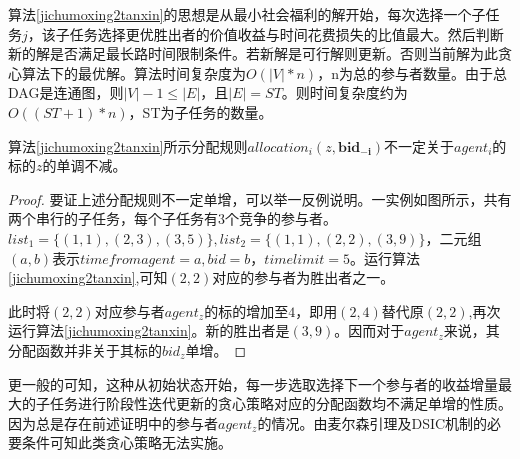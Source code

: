 \documentclass[promaster]{thesis-uestc}
\begin{document}
算法\ref{jichumoxing2tanxin}的思想是从最小社会福利的解开始，每次选择一个子任务$j$，该子任务选择更优胜出者的价值收益与时间花费损失的比值最大。然后判断新的解是否满足最长路时间限制条件。若新解是可行解则更新。否则当前解为此贪心算法下的最优解。算法时间复杂度为$O(|V|*n)$，n为总的参与者数量。由于总DAG是连通图，则$|V|- 1\leq |E|$，且$|E| = ST$。则时间复杂度约为$O((ST+1)*n)$，ST为子任务的数量。

\begin{theorem}
    算法\ref{jichumoxing2tanxin}所示分配规则$allocation_i(z,\mathbf{bid_{-i}})$不一定关于$agent_i$的标的$z$的单调不减。
\end{theorem}

\begin{proof}
    要证上述分配规则不一定单增，可以举一反例说明。一实例如图所示，共有两个串行的子任务，每个子任务有$3$个竞争的参与者。$list_1=\{(1,1),(2,3),(3,5)\},list_2=\{(1,1),(2,2),(3,9)\}$，二元组$(a,b)$表示$timefromagent=a,bid=b$，$timelimit=5$。运行算法\ref{jichumoxing2tanxin},可知$(2,2)$对应的参与者为胜出者之一。

    此时将$(2,2)$对应参与者$agent_z$的标的增加至$4$，即用$(2,4)$替代原$(2,2)$,再次运行算法\ref{jichumoxing2tanxin}。新的胜出者是$(3,9)$。因而对于$agent_z$来说，其分配函数并非关于其标的$bid_z$单增。
\end{proof}

更一般的可知，这种从初始状态开始，每一步选取选择下一个参与者的收益增量最大的子任务进行阶段性迭代更新的贪心策略对应的分配函数均不满足单增的性质。因为总是存在前述证明中的参与者$agent_z$的情况。由麦尔森引理及DSIC机制的必要条件可知此类贪心策略无法实施。
\end{document}
